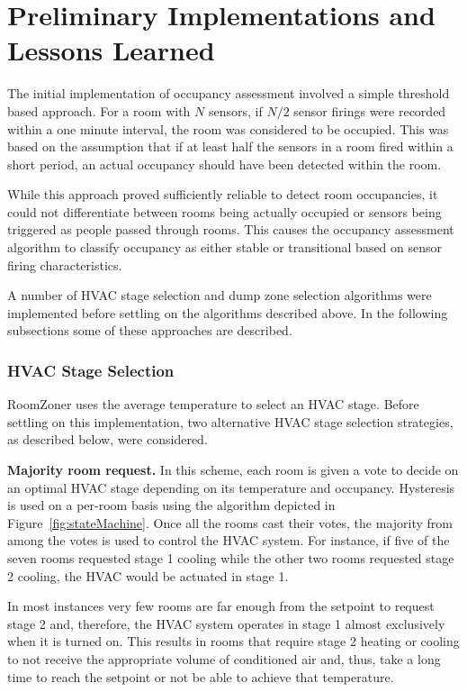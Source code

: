 \section{Preliminary Implementations and Lessons Learned}
The initial implementation of occupancy assessment involved a simple threshold
based approach. For a room with $N$ sensors, if $N/2$ sensor firings were
recorded within a one minute interval, the room was considered to be
occupied. This was based on the assumption that if at least half the sensors in
a room fired within a short period, an actual occupancy should have been
detected within the room. 

While this approach proved sufficiently reliable to detect room occupancies, it
could not differentiate between rooms being actually occupied or sensors being
triggered as people passed through rooms. This causes the occupancy assessment
algorithm to classify occupancy as either stable or transitional based on sensor
firing characteristics.

A number of HVAC stage selection and dump zone selection algorithms were
implemented before settling on the algorithms described above. In the following
subsections some of these approaches are described.

\subsubsection{HVAC Stage Selection}
RoomZoner uses the average temperature to select an HVAC stage. Before settling
on this implementation, two alternative HVAC stage selection strategies, as
described below, were considered.

\par {\bf Majority room request. } In this scheme, each room is given a vote to
decide on an optimal HVAC stage depending on its temperature and
occupancy. Hysteresis is used on a per-room basis using the algorithm depicted
in Figure~\ref{fig:stateMachine}. Once all the rooms cast their votes, the
majority from among the votes is used to control the HVAC system. For instance,
if five of the seven rooms requested stage 1 cooling while the other two rooms
requested stage 2 cooling, the HVAC would be actuated in stage 1. 

In most instances very few rooms are far enough from the setpoint to request
stage 2 and, therefore, the HVAC system operates in stage 1 almost exclusively
when it is turned on. This results in rooms that require stage 2 heating or
cooling to not receive the appropriate volume of conditioned air and, thus, take
a long time to reach the setpoint or not be able to achieve that temperature.

